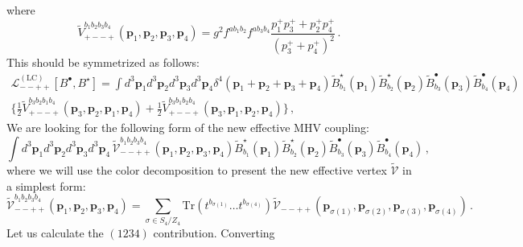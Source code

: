 \documentclass[english,american]{article}
\begin{document}
where
\begin{equation}
\tilde{V}_{+--+}^{b_{1}b_{2}b_{3}b_{4}}\left(\mathbf{p}_{1},\mathbf{p}_{2},\mathbf{p}_{3},\mathbf{p}_{4}\right)=g{}^{2}f^{ab_{1}b_{2}}f^{ab_{3}b_{4}}\frac{p_{1}^{+}p_{3}^{+}+p_{2}^{+}p_{4}^{+}}{\left(p_{3}^{+}+p_{4}^{+}\right)^{2}}\,.
\end{equation}
This should be symmetrized as follows:
\begin{multline}
\mathcal{L}_{--++}^{\left(\mathrm{LC}\right)}\left[B^{\bullet},B^{\star}\right]=\int d^{3}\mathbf{p}_{1}d^{3}\mathbf{p}_{2}d^{3}\mathbf{p}_{3}d^{3}\mathbf{p}_{4}\delta^{4}\left(\mathbf{p}_{1}+\mathbf{p}_{2}+\mathbf{p}_{3}+\mathbf{p}_{4}\right)\tilde{B}_{b_{1}}^{\star}\left(\mathbf{p}_{1}\right)\tilde{B}_{b_{2}}^{\star}\left(\mathbf{p}_{2}\right)\tilde{B}_{b_{3}}^{\bullet}\left(\mathbf{p}_{3}\right)\tilde{B}_{b_{4}}^{\bullet}\left(\mathbf{p}_{4}\right)\\
\Bigg\{\frac{1}{2}\tilde{V}_{+--+}^{b_{3}b_{2}b_{1}b_{4}}\left(\mathbf{p}_{3},\mathbf{p}_{2},\mathbf{p}_{1},\mathbf{p}_{4}\right)+\frac{1}{2}\tilde{V}_{+--+}^{b_{3}b_{1}b_{2}b_{4}}\left(\mathbf{p}_{3},\mathbf{p}_{1},\mathbf{p}_{2},\mathbf{p}_{4}\right)\Bigg\}\,,\label{eq:4pointcontribtomhv}
\end{multline}
We are looking for the following form of the new effective MHV coupling:
\begin{equation}
\int d^{3}\mathbf{p}_{1}d^{3}\mathbf{p}_{2}d^{3}\mathbf{p}_{3}d^{3}\mathbf{p}_{4}\,\tilde{\mathcal{V}}_{--++}^{b_{1}b_{2}b_{3}b_{4}}\left(\mathbf{p}_{1},\mathbf{p}_{2},\mathbf{p}_{3},\mathbf{p}_{4}\right)\tilde{B}_{b_{1}}^{\star}\left(\mathbf{p}_{1}\right)\tilde{B}_{b_{2}}^{\star}\left(\mathbf{p}_{2}\right)\tilde{B}_{b_{3}}^{\bullet}\left(\mathbf{p}_{3}\right)\tilde{B}_{b_{4}}^{\bullet}\left(\mathbf{p}_{4}\right)\,,
\end{equation}
where we will use the color decomposition to present the new effective
vertex $\tilde{\mathcal{V}}$ in a simplest form:
\begin{equation}
\tilde{\mathcal{V}}_{--++}^{b_{1}b_{2}b_{3}b_{4}}\left(\mathbf{p}_{1},\mathbf{p}_{2},\mathbf{p}_{3},\mathbf{p}_{4}\right)=\sum_{\sigma\in S_{4}/Z_{4}}\mathrm{Tr}\left(t^{b_{\sigma\left(1\right)}}\dots t^{b_{\sigma\left(4\right)}}\right)\tilde{\mathcal{V}}_{--++}\left(\mathbf{p}_{\sigma\left(1\right)},\mathbf{p}_{\sigma\left(2\right)},\mathbf{p}_{\sigma\left(3\right)},\mathbf{p}_{\sigma\left(4\right)}\right)\,.
\end{equation}
Let us calculate the $\left(1234\right)$ contribution. Converting
\end{document}

